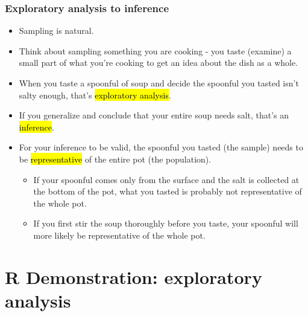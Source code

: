 \documentclass[slidestop,compress,mathserif]{beamer}
\begin{document}
\begin{frame}
\frametitle{Exploratory analysis to inference}

	\begin{itemize}
		\item Sampling is natural.
		\pause
		\item Think about sampling something you are cooking - you taste (examine) a small part of what you're cooking to get an idea about the dish as a whole.
		\pause
		\item When you taste a spoonful of soup and decide the spoonful you tasted isn't salty enough, that's \hl{exploratory analysis}.
		\pause
		\item If you generalize and conclude that your entire soup needs salt, that's an \hl{inference}.
		\pause
		\item For your inference to be valid, the spoonful you tasted (the sample) needs to be \hl{representative} of the entire pot (the population).

		\begin{itemize}
			\item If your spoonful comes only from the surface and the salt is collected at the bottom of the pot, what you tasted is probably not representative of the whole pot.
			\item If you first stir the soup thoroughly before you taste, your spoonful will more likely be representative of the whole pot.
		\end{itemize}

	\end{itemize}

\end{frame}

\section{R Demonstration: exploratory analysis}
\end{document}
